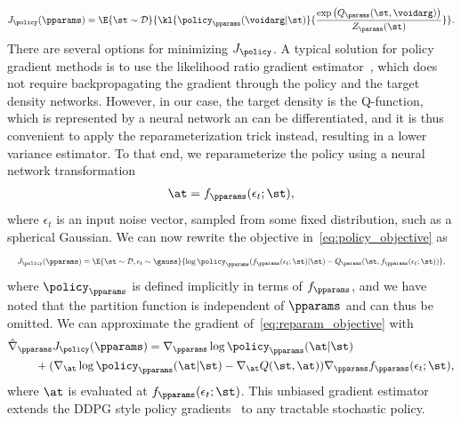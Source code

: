 \documentclass{article}
\begin{document}
\begin{align}
J_\policy(\pparams) = \E{\st\sim\mathcal{D}}{\kl{\policy_\pparams(\voidarg|\st)}{\frac{\exp\left(Q_\params(\st, \voidarg)\right)}{Z_\params(\st)}}}.
\label{eq:policy_objective}
\end{align}
There are several options for minimizing $J_\policy$. A typical solution for policy gradient methods is to use the likelihood ratio gradient estimator~\citep{williams1992simple}, which does not require backpropagating the gradient through the policy and the target density networks. However, in our case, the target density is the Q-function, which is represented by a neural network an can be differentiated, and it is thus convenient to apply the reparameterization trick instead, resulting in a lower variance estimator. To that end, we reparameterize the policy using a neural network transformation 
\begin{align}
\at = f_\pparams(\epsilon_t; \st),
\end{align}
where $\epsilon_t$ is an input noise vector, sampled from some fixed distribution, such as a spherical Gaussian. We can now rewrite the objective in~\autoref{eq:policy_objective} as
\begin{align}
\resizebox{\columnwidth}{!}{$
J_\policy(\pparams) = \E{\st\sim\mathcal{D},\epsilon_t\sim\gauss}{\log \policy_\pparams(f_\pparams(\epsilon_t;\st)|\st) - Q_\params(\st, f_\pparams(\epsilon_t;\st))},$}
\label{eq:reparam_objective}
\end{align}
where $\policy_\pparams$ is defined implicitly in terms of $f_\pparams$, and we have noted that the partition function is independent of $\pparams$ and can thus be omitted. We can approximate the gradient of~\autoref{eq:reparam_objective} with
\begin{align}
&\hat\nabla_\pparams J_\policy(\pparams) = \nabla_\pparams \log \policy_\pparams(\at|\st) \notag\\
&\ \ \ \ \ \ \ + (\nabla_\at \log \policy_\pparams(\at|\st)
- \nabla_\at Q(\st, \at))\nabla_\pparams f_\pparams(\epsilon_t;\st),
\label{eq:policy_gradient}
\end{align}
where $\at$ is evaluated at $f_\pparams(\epsilon_t; \st)$. This unbiased gradient estimator extends the DDPG style policy gradients~\citep{lillicrap2015continuous} to any tractable stochastic policy.


%
%
%
%
%
%
%
%
%
%
%
%
\end{document}
